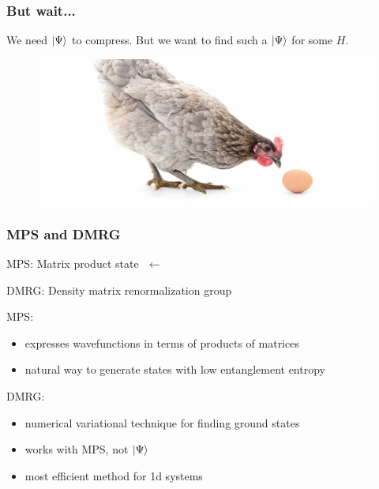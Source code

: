 \documentclass{beamer}
\theoremstyle{definition}
\begin{document}
\begin{frame}
	\frametitle{But wait...}
		
	We need $\ket{\Psi}$ to compress. But we want to find such a $\ket{\Psi}$ for some $H$. \\
	
	\pause
	
	\vspace{15pt}
	
	\begin{figure}[!htb]
		\centering
		\includegraphics[scale=0.2]{chickenegg.jpg}
	\end{figure}
	
	\vspace{8pt}

\end{frame}





\begin{frame}
	\frametitle{MPS and DMRG}
	MPS: Matrix product state $\,\,\leftarrow$ \\
	
	\vspace{8pt}
	
	DMRG: Density matrix renormalization group\\
	
	\vspace{8pt}
	
	\pause
	
	
	\vspace{12pt}
	
	MPS: 
	\begin{itemize}
		\item expresses wavefunctions in terms of products of matrices
		
		\item natural way to generate states with low entanglement entropy
	\end{itemize}
\pause

	DMRG:
	\begin{itemize}
		\item numerical variational technique for finding ground states
		
		\item works with MPS, not $\ket{\Psi}$
		
		\item most efficient method for 1d systems
	\end{itemize}
	
	
\end{frame}
\end{document}
